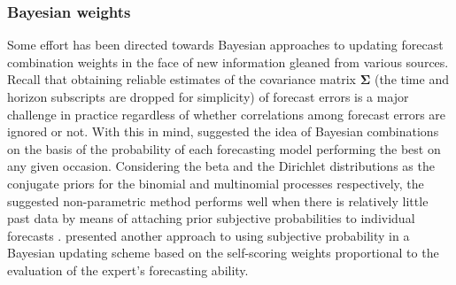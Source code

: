 \documentclass[a4paper,11pt]{article}
\begin{document}
\subsubsection*{Bayesian weights}

Some effort has been directed towards Bayesian approaches to updating forecast combination weights in the face of new information gleaned from various sources. Recall that obtaining reliable estimates of the covariance matrix $\bm{\Sigma}$ (the time and horizon subscripts are dropped for simplicity) of forecast errors is a major challenge in practice regardless of whether correlations among forecast errors are ignored or not. With this in mind, \citet{Bunn1975-vz} suggested the idea of Bayesian combinations on the basis of the probability of each forecasting model performing the best on any given occasion. Considering the beta and the Dirichlet distributions as the conjugate priors for the binomial and multinomial processes respectively, the suggested non-parametric method performs well when there is relatively little past data by means of attaching prior subjective probabilities to individual forecasts \citep{Bunn1985-vo,De_Menezes2000-vd}. \citet{Oller1978-wx} presented another approach to using subjective probability in a Bayesian updating scheme based on the self-scoring weights proportional to the evaluation of the expert's forecasting ability.
\end{document}
